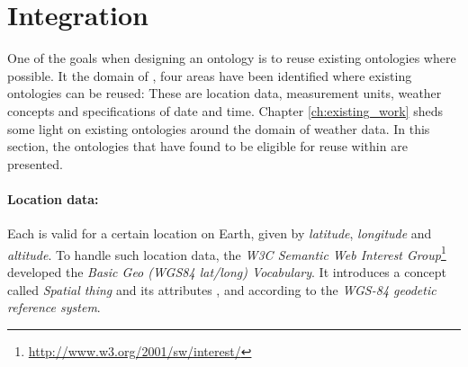 \section{Integration}
\label{sec:integration}

One of the goals when designing an ontology is to reuse existing ontologies where possible. It the domain of \thinkhomeweather, four areas have been identified where existing ontologies can be reused: These are location data, measurement units, weather concepts and specifications of date and time. Chapter \ref{ch:existing_work} sheds some light on existing ontologies around the domain of weather data. In this section, the ontologies that have found to be eligible for reuse within \thinkhomeweather are presented.

\paragraph{Location data:}

Each  is valid for a certain location on Earth, given by \emph{latitude}, \emph{longitude} and \emph{altitude}. To handle such location data, the \emph{W3C Semantic Web Interest Group}\footnote{\href{http://www.w3.org/2001/sw/interest/}{http://www.w3.org/2001/sw/interest/}} developed the \emph{Basic Geo (WGS84 lat/long) Vocabulary}\cite{wgs84_vocabulary}. It introduces a concept called \emph{Spatial thing} and its attributes ,  and  according to the \emph{WGS-84 geodetic reference system}\cite{WGS84}.

